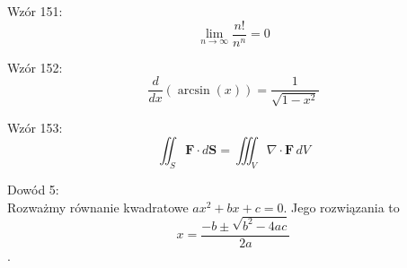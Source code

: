 \documentclass{article}
\begin{document}
Wzór 151:
\[ \lim_{{n \to \infty}} \frac{n!}{n^n} = 0 \]

Wzór 152:
\[ \frac{d}{dx}\left(\arcsin(x)\right) = \frac{1}{\sqrt{1-x^2}} \]

Wzór 153:
\[ \iint_S \mathbf{F} \cdot d\mathbf{S} = \iiint_V \nabla \cdot \mathbf{F} \,dV \]

Dowód 5: \\
Rozważmy równanie kwadratowe \( ax^2 + bx + c = 0 \). Jego rozwiązania to
\[ x = \frac{-b \pm \sqrt{b^2-4ac}}{2a} \].
\end{document}
